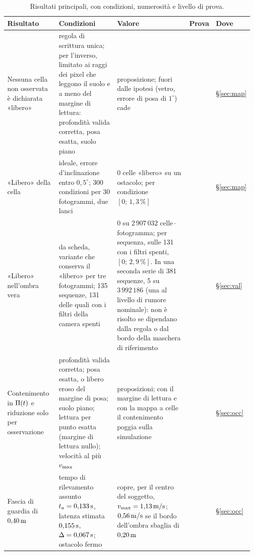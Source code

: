 \begin{table}[p]
\centering\footnotesize
\setlength{\tabcolsep}{4pt}
\caption{Risultati principali, con condizioni, numerosità e livello di prova.}\label{tab:intro-sintesi}
\begin{tabularx}{\textwidth}{@{}>{\RaggedRight\arraybackslash}p{2.8cm}>{\RaggedRight\arraybackslash}p{4.1cm}L>{\RaggedRight\arraybackslash}p{1.2cm}>{\RaggedRight\arraybackslash}p{1.05cm}@{}}
\toprule
Risultato & Condizioni & Valore & Prova & Dove\\
\midrule
Nessuna cella non osservata è dichiarata «libero» & regola di scrittura unica; per l'inverso, limitato ai raggi dei pixel che leggono il suolo e a meno del margine di lettura: profondità valida corretta, posa esatta, suolo piano & proposizione; fuori dalle ipotesi (vetro, errore di posa di $1^\circ$) cade &  & \S\ref{sec:map}\\
«Libero» della cella & ideale, errore d'inclinazione entro $0{,}5^\circ$; 300 condizioni per 30 fotogrammi, due lanci & 0 celle «libero» su un ostacolo; per condizione $[0;\,1{,}3\,\%]$ &  & \S\ref{sec:map}\\
«Libero» nell'ombra vera & da scheda, variante che conserva il «libero» per tre fotogrammi; 135 sequenze, 131 delle quali con i filtri della camera spenti & 0 su $2\,907\,032$ celle\,$\cdot$\,fotogramma; per sequenza, sulle 131 con i filtri spenti, $[0;\,2{,}9\,\%]$. In una seconda serie di 381 sequenze, 5 su $3\,992\,186$ (una al livello di rumore nominale): non è risolto se dipendano dalla regola o dal bordo della maschera di riferimento &  & \S\ref{sec:val}\\
Contenimento in $\Pi(t)$ e riduzione solo per osservazione & profondità valida corretta; posa esatta, o libero eroso del margine di posa; suolo piano; lettura per punto esatta (margine di lettura nullo); velocità al più $v_{\max}$ & proposizioni; con il margine di lettura e con la mappa a celle il contenimento poggia sulla simulazione &  & \S\ref{sec:occ}\\
Fascia di guardia di $0{,}40\,\mathrm{m}$ & tempo di rilevamento assunto $t_a=0{,}133\,\mathrm{s}$, latenza stimata $0{,}155\,\mathrm{s}$, $\Delta=0{,}067\,\mathrm{s}$; ostacolo fermo & copre, per il centro del soggetto, $v_{\max}=1{,}13\,\mathrm{m/s}$; $0{,}56\,\mathrm{m/s}$ se il bordo dell'ombra sbaglia di $0{,}20\,\mathrm{m}$ &  & \S\ref{sec:occ}\\

\end{tabularx}
\end{table}
